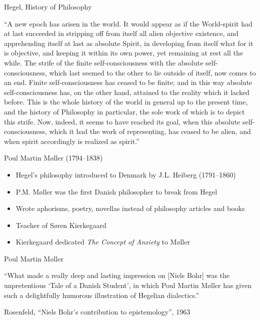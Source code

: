 \documentclass[ignorenonframetext, ]{beamer}
\begin{document}
\begin{frame}{Hegel, History of Philosophy}

  ``A new epoch has arisen in the world. It would appear as if the
  World-spirit had at last succeeded in stripping off from itself all
  alien objective existence, and apprehending itself at last as
  absolute Spirit, in developing from itself what for it is objective,
  and keeping it within its own power, yet remaining at rest all the
  while. The strife of the finite self-consciousness with the absolute
  self-consciousness, which last seemed to the other to lie outside of
  itself, now comes to an end. Finite self-consciousness has ceased to
  be finite; and in this way absolute self-consciousness has, on the
  other hand, attained to the reality which it lacked before. This is
  the whole history of the world in general up to the present time,
  and the history of Philosophy in particular, the sole work of which
  is to depict this strife. Now, indeed, it seems to have reached its
  goal, when this absolute self-consciousness, which it had the work
  of representing, has ceased to be alien, and when spirit accordingly
  is realized as spirit.''

\end{frame}

\begin{frame}{Poul Martin Møller (1794--1838)}

  \begin{itemize}
  \item Hegel's philosophy introduced to Denmark by J.L. Heiberg
    (1791--1860)
  \item P.M. Møller was the first Danish philosopher to break from
    Hegel
  \item Wrote aphorisms, poetry, novellas instead of philosophy
    articles and books
  \item Teacher of Søren Kierkegaard
  \item Kierkegaard dedicated \emph{The Concept of Anxiety} to Møller
  \end{itemize}

\end{frame}  

\begin{frame}{Poul Martin Møller}

  ``What made a really deep and lasting impression on [Niels Bohr] was
  the unpretentious `Tale of a Danish Student', in which Poul Martin
  M{\o}ller has given such a delightfully humorous illustration of
  Hegelian dialectics.''

  \medskip Rosenfeld, ``Niels Bohr's contribution to epistemology'',
  1963

\end{frame}
  
\end{document}
